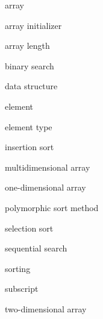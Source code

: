 \label{chapter-summary}

\label{technical-terms}

\begin{KT}
array

array \break initializer

array length

binary search

data structure 

element

element type

insertion sort

multidimensional array

one-dimensional \break array

polymorphic sort method

selection sort

sequential search

sorting

subscript

two-dimensional array

\end{KT}


